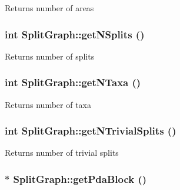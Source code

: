 \label{classSplitGraph_adfdcee57a677ea807d595328abb28481}
\begin{DoxyReturn}{Returns}
number of areas 
\end{DoxyReturn}
\hypertarget{classSplitGraph_a848a5f43fcb791dd99a1865d5fe9df46}{
\subsubsection[{getNSplits}]{\setlength{\rightskip}{0pt plus 5cm}int SplitGraph::getNSplits ()}}
\label{classSplitGraph_a848a5f43fcb791dd99a1865d5fe9df46}
\begin{DoxyReturn}{Returns}
number of splits 
\end{DoxyReturn}
\hypertarget{classSplitGraph_a779ae52f511731d598f6133ecb0deb51}{
\subsubsection[{getNTaxa}]{\setlength{\rightskip}{0pt plus 5cm}int SplitGraph::getNTaxa ()}}
\label{classSplitGraph_a779ae52f511731d598f6133ecb0deb51}
\begin{DoxyReturn}{Returns}
number of taxa 
\end{DoxyReturn}
\hypertarget{classSplitGraph_a4e3c9a6363de8ac9d1bd15797306aaf1}{
\subsubsection[{getNTrivialSplits}]{\setlength{\rightskip}{0pt plus 5cm}int SplitGraph::getNTrivialSplits ()}}
\label{classSplitGraph_a4e3c9a6363de8ac9d1bd15797306aaf1}
\begin{DoxyReturn}{Returns}
number of trivial splits 
\end{DoxyReturn}
\hypertarget{classSplitGraph_a6eb74cff199a65a2e3b3a17c7a7c96e9}{
\subsubsection[{getPdaBlock}]{$\ast$ SplitGraph::getPdaBlock ()}}

